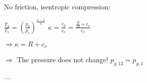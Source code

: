 No friction, isentropic compression:  

\( \frac{T_2}{T_1} = \left(\frac{p_2}{p_1}\right)^{\frac{\kappa - 1}{\kappa}} \)  
\( \kappa = \frac{c_p}{c_v} = \frac{\frac{R}{M} + c_v}{c_v} \)  

\( \Rightarrow \kappa = R + c_v \)  

\( \Rightarrow \) The pressure does not change!  
\( p_{g,12} = p_{g,1} \)  

---